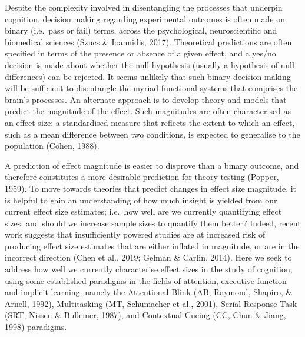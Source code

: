 \documentclass[
  man]{apa6}
\begin{document}
Despite the complexity involved in disentangling the processes that underpin cognition, decision making regarding experimental outcomes is often made on binary (i.e.~pass or fail) terms, across the psychological, neuroscientific and biomedical sciences (Szucs \& Ioannidis, 2017). Theoretical predictions are often specified in terms of the presence or absence of a given effect, and a yes/no decision is made about whether the null hypothesis (usually a hypothesis of null differences) can be rejected. It seems unlikely that such binary decision-making will be sufficient to disentangle the myriad functional systems that comprises the brain's processes. An alternate approach is to develop theory and models that predict the magnitude of the effect. Such magnitudes are often characterised as an effect size: a standardised measure that reflects the extent to which an effect, such as a mean difference between two conditions, is expected to generalise to the population (Cohen, 1988).

A prediction of effect magnitude is easier to disprove than a binary outcome, and therefore constitutes a more desirable prediction for theory testing (Popper, 1959). To move towards theories that predict changes in effect size magnitude, it is helpful to gain an understanding of how much insight is yielded from our current effect size estimates; i.e.~how well are we currently quantifying effect sizes, and should we increase sample sizes to quantify them better? Indeed, recent work suggests that insufficiently powered studies are at increased risk of producing effect size estimates that are either inflated in magnitude, or are in the incorrect direction (Chen et al., 2019; Gelman \& Carlin, 2014). Here we seek to address how well we currently characterise effect sizes in the study of cognition, using some established paradigms in the fields of attention, executive function and implicit learning; namely the Attentional Blink (AB, Raymond, Shapiro, \& Arnell, 1992), Multitasking (MT, Schumacher et al., 2001), Serial Response Task (SRT, Nissen \& Bullemer, 1987), and Contextual Cueing (CC, Chun \& Jiang, 1998) paradigms.
\end{document}

